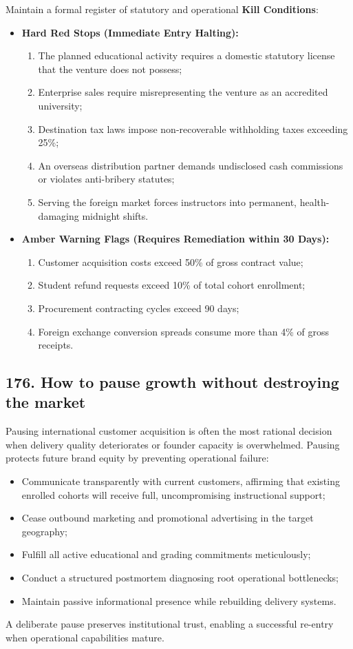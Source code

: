 Maintain a formal register of statutory and operational \textbf{Kill Conditions}:
\begin{itemize}
    \item \textbf{Hard Red Stops (Immediate Entry Halting):}
    \begin{enumerate}
        \item The planned educational activity requires a domestic statutory license that the venture does not possess;
        \item Enterprise sales require misrepresenting the venture as an accredited university;
        \item Destination tax laws impose non-recoverable withholding taxes exceeding 25\%;
        \item An overseas distribution partner demands undisclosed cash commissions or violates anti-bribery statutes;
        \item Serving the foreign market forces instructors into permanent, health-damaging midnight shifts.
    \end{enumerate}
    \item \textbf{Amber Warning Flags (Requires Remediation within 30 Days):}
    \begin{enumerate}
        \item Customer acquisition costs exceed 50\% of gross contract value;
        \item Student refund requests exceed 10\% of total cohort enrollment;
        \item Procurement contracting cycles exceed 90 days;
        \item Foreign exchange conversion spreads consume more than 4\% of gross receipts.
    \end{enumerate}
\end{itemize}

\subsection{176. How to pause growth without destroying the market}

Pausing international customer acquisition is often the most rational decision when delivery quality deteriorates or founder capacity is overwhelmed. Pausing protects future brand equity by preventing operational failure:
\begin{itemize}
    \item Communicate transparently with current customers, affirming that existing enrolled cohorts will receive full, uncompromising instructional support;
    \item Cease outbound marketing and promotional advertising in the target geography;
    \item Fulfill all active educational and grading commitments meticulously;
    \item Conduct a structured postmortem diagnosing root operational bottlenecks;
    \item Maintain passive informational presence while rebuilding delivery systems.
\end{itemize}
A deliberate pause preserves institutional trust, enabling a successful re-entry when operational capabilities mature.

